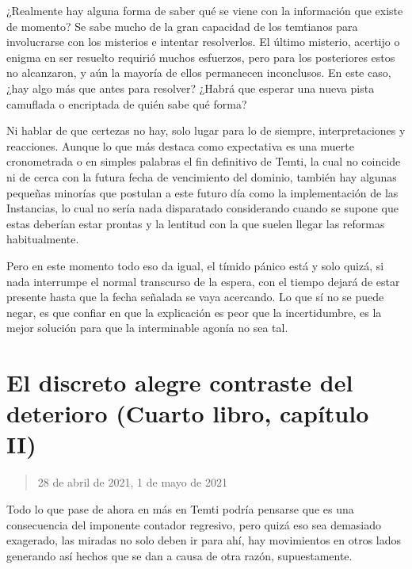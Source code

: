 \documentclass[
  spanish,
]{book}
\begin{document}
¿Realmente hay alguna forma de saber qué se viene con la información que existe de momento? Se sabe mucho de la gran capacidad de los temtianos para involucrarse con los misterios e intentar resolverlos. El último misterio, acertijo o enigma en ser resuelto requirió muchos esfuerzos, pero para los posteriores estos no alcanzaron, y aún la mayoría de ellos permanecen inconclusos. En este caso, ¿hay algo más que antes para resolver? ¿Habrá que esperar una nueva pista camuflada o encriptada de quién sabe qué forma?

Ni hablar de que certezas no hay, solo lugar para lo de siempre, interpretaciones y reacciones. Aunque lo que más destaca como expectativa es una muerte cronometrada o en simples palabras el fin definitivo de Temti, la cual no coincide ni de cerca con la futura fecha de vencimiento del dominio, también hay algunas pequeñas minorías que postulan a este futuro día como la implementación de las Instancias, lo cual no sería nada disparatado considerando cuando se supone que estas deberían estar prontas y la lentitud con la que suelen llegar las reformas habitualmente.

Pero en este momento todo eso da igual, el tímido pánico está y solo quizá, si nada interrumpe el normal transcurso de la espera, con el tiempo dejará de estar presente hasta que la fecha señalada se vaya acercando. Lo que sí no se puede negar, es que confiar en que la explicación es peor que la incertidumbre, es la mejor solución para que la interminable agonía no sea tal.

\hypertarget{el-discreto-alegre-contraste-del-deterioro-cuarto-libro-capuxedtulo-ii}{%
\section{El discreto alegre contraste del deterioro (Cuarto libro, capítulo II)}\label{el-discreto-alegre-contraste-del-deterioro-cuarto-libro-capuxedtulo-ii}}

\begin{quote}
28 de abril de 2021, 1 de mayo de 2021
\end{quote}

Todo lo que pase de ahora en más en Temti podría pensarse que es una consecuencia del imponente contador regresivo, pero quizá eso sea demasiado exagerado, las miradas no solo deben ir para ahí, hay movimientos en otros lados generando así hechos que se dan a causa de otra razón, supuestamente.
\end{document}
